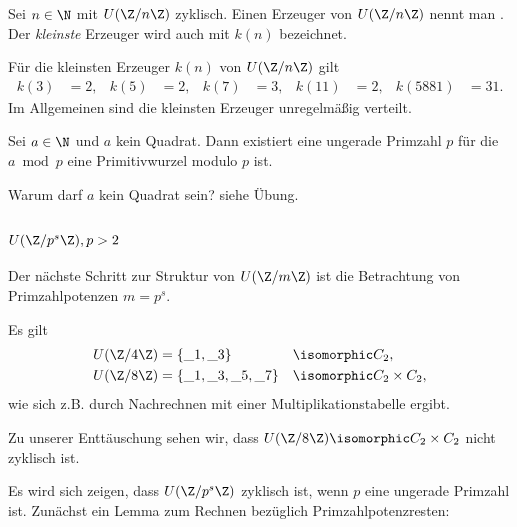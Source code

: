 \begin{df*}
	Sei $n \in \N$ mit $U(\Z / n \Z)$ zyklisch.
	Einen Erzeuger von $U(\Z / n \Z)$ nennt man .
	Der \emph{kleinste} Erzeuger wird auch mit $k(n)$ bezeichnet.
\end{df*}

\begin{ex*}
	Für die kleinsten Erzeuger $k(n)$ von $U(\Z / n\Z)$ gilt
	\begin{align*}
		k(3) &= 2, &
		k(5) &= 2, &
		k(7) &= 3, &
		k(11) &= 2, &
		k(5881) &= 31.
	\end{align*}
	Im Allgemeinen sind die kleinsten Erzeuger unregelmäßig verteilt.
\end{ex*}

\begin{conj*}[E. Artin]
	Sei $a \in \N$ und $a$ kein Quadrat.
	Dann existiert eine ungerade Primzahl $p$ für die $a \bmod p$ eine Primitivwurzel modulo $p$ ist.
	\begin{note}
		Warum darf $a$ kein Quadrat sein?
		siehe Übung.
	\end{note}
\end{conj*}

\subsection{\texorpdfstring{$U(\Z / p^s \Z), p > 2$}{U(ℤ/p\textasciicircum sℤ), p>2}}

Der nächste Schritt zur Struktur von $U(\Z / m \Z)$ ist die Betrachtung von Primzahlpotenzen $m = p^s$.

\begin{ex*}
	Es gilt
	\begin{alignat*}{3}
		U(\Z / 4 \Z) &= \{ \_ 1, \_ 3 \}& & \isomorphic C_2, \\
		U(\Z / 8 \Z) &= \{ \_ 1, \_ 3, \_ 5, \_ 7 \}& & \isomorphic C_2 \times C_2,
	\end{alignat*}
	wie sich z.B. durch Nachrechnen mit einer Multiplikationstabelle ergibt.

	Zu unserer Enttäuschung sehen wir, dass $U(\Z / 8 \Z) \isomorphic C_2 \times C_2$ nicht zyklisch ist.
\end{ex*}

Es wird sich zeigen, dass $U(\Z / p^s \Z)$ zyklisch ist, wenn $p$ eine ungerade Primzahl ist.
Zunächst ein Lemma zum Rechnen bezüglich Primzahlpotenzresten:


